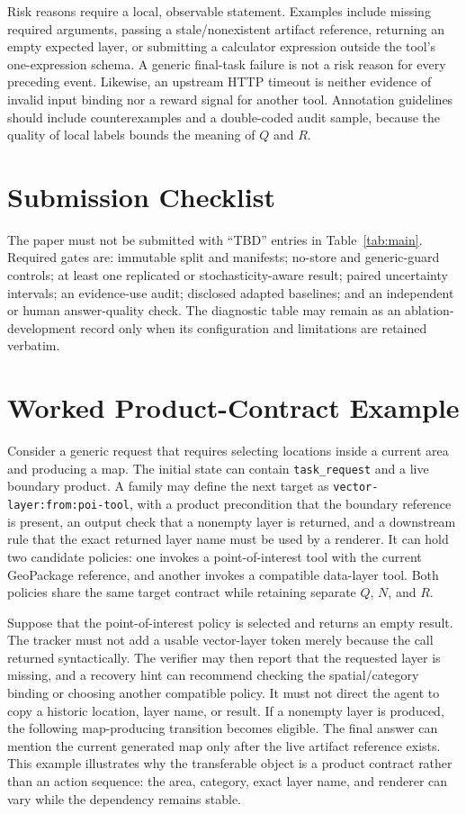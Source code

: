 \documentclass[10pt]{article}
\begin{document}
Risk reasons require a local, observable statement. Examples include missing required arguments, passing a stale/nonexistent artifact reference, returning an empty expected layer, or submitting a calculator expression outside the tool's one-expression schema. A generic final-task failure is not a risk reason for every preceding event. Likewise, an upstream HTTP timeout is neither evidence of invalid input binding nor a reward signal for another tool. Annotation guidelines should include counterexamples and a double-coded audit sample, because the quality of local labels bounds the meaning of $Q$ and $R$.

\section{Submission Checklist}
The paper must not be submitted with ``TBD'' entries in Table~\ref{tab:main}. Required gates are: immutable split and manifests; no-store and generic-guard controls; at least one replicated or stochasticity-aware result; paired uncertainty intervals; an evidence-use audit; disclosed adapted baselines; and an independent or human answer-quality check. The diagnostic table may remain as an ablation-development record only when its configuration and limitations are retained verbatim.

\section{Worked Product-Contract Example}
Consider a generic request that requires selecting locations inside a current area and producing a map. The initial state can contain \texttt{task\_request} and a live boundary product. A family may define the next target as \texttt{vector-layer:from:poi-tool}, with a product precondition that the boundary reference is present, an output check that a nonempty layer is returned, and a downstream rule that the exact returned layer name must be used by a renderer. It can hold two candidate policies: one invokes a point-of-interest tool with the current GeoPackage reference, and another invokes a compatible data-layer tool. Both policies share the same target contract while retaining separate $Q$, $N$, and $R$.

Suppose that the point-of-interest policy is selected and returns an empty result. The tracker must not add a usable vector-layer token merely because the call returned syntactically. The verifier may then report that the requested layer is missing, and a recovery hint can recommend checking the spatial/category binding or choosing another compatible policy. It must not direct the agent to copy a historic location, layer name, or result. If a nonempty layer is produced, the following map-producing transition becomes eligible. The final answer can mention the current generated map only after the live artifact reference exists. This example illustrates why the transferable object is a product contract rather than an action sequence: the area, category, exact layer name, and renderer can vary while the dependency remains stable.
\end{document}
